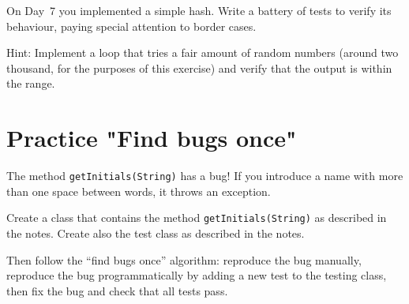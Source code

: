 \documentclass{article}
\begin{document}
On Day~7 you implemented a simple hash. Write a battery of tests to
verify its behaviour, paying special attention to border cases. 

Hint: Implement a loop that tries a fair amount of random numbers
(around two thousand, for the purposes of this exercise) and verify
that the output is within the range. 


\section{Practice "Find bugs once"}
\label{sec:practice-find-bugs}


The method \verb+getInitials(String)+ has a bug! If you introduce a
name with more than one space between words, it throws an exception.

Create a class that contains the method \verb+getInitials(String)+ as
described in the notes. Create also the test class as described in the
notes. 

Then follow the ``find bugs once'' algorithm: reproduce the bug manually,
reproduce the bug programmatically by adding a new test to the testing
class, then fix the bug and check that all tests pass. 



\end{document}
